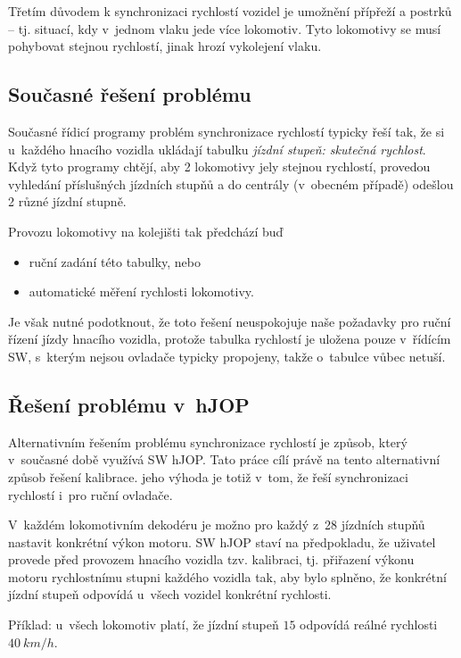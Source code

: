 Třetím důvodem k synchronizaci rychlostí vozidel je umožnění přípřeží a postrků
-- tj.  situací, kdy v~jednom vlaku jede více lokomotiv. Tyto lokomotivy se
musí pohybovat stejnou rychlostí, jinak hrozí vykolejení vlaku.

\subsection{Současné řešení problému}

Současné řídicí programy problém synchronizace rychlostí typicky řeší tak, že
si u~každého hnacího vozidla ukládají tabulku \textit{jízdní stupeň: skutečná
rychlost}. Když tyto programy chtějí, aby 2 lokomotivy jely stejnou rychlostí,
provedou vyhledání příslušných jízdních stupňů a do centrály (v~obecném
případě) odešlou 2 různé jízdní stupně.

Provozu lokomotivy na kolejišti tak předchází buď

\begin{itemize}
	\item ruční zadání této tabulky, nebo
	\item automatické měření rychlosti lokomotivy.
\end{itemize}

Je však nutné podotknout, že toto řešení neuspokojuje naše požadavky pro
ruční řízení jízdy hnacího vozidla, protože tabulka rychlostí je uložena
pouze v~řídícím SW, s~kterým nejsou ovladače typicky propojeny, takže o~tabulce
vůbec netuší.

\subsection{Řešení problému v~hJOP}

Alternativním řešením problému synchronizace rychlostí je způsob, který
v~současné době využívá SW hJOP. Tato práce cílí právě na tento alternativní
způsob řešení kalibrace. jeho výhoda je totiž v~tom, že řeší synchronizaci
rychlostí i~pro ruční ovladače.

V~každém lokomotivním dekodéru je možno pro každý z~28 jízdních stupňů nastavit
konkrétní výkon motoru. SW hJOP staví na předpokladu, že uživatel provede před
provozem hnacího vozidla tzv. kalibraci, tj. přiřazení výkonu motoru
rychlostnímu stupni každého vozidla tak, aby bylo splněno, že konkrétní jízdní
stupeň odpovídá u~všech vozidel konkrétní rychlosti.

Příklad: u~všech lokomotiv platí, že jízdní stupeň $15$ odpovídá reálné
rychlosti $40\ km/h$.

